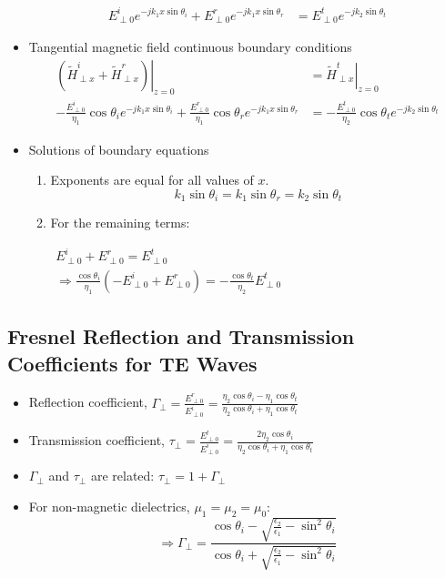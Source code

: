 \documentclass[a4paper]{article}
\begin{document}
\begin{itemize}
\begin{align*}
        E^i_{\perp 0}e^{-jk_1 x\sin\theta_i} + E^r_{\perp 0}e^{-jk_1 x\sin\theta_r} &= E^t_{\perp 0}e^{-jk_2\sin\theta_t}
    \end{align*}
    \item Tangential magnetic field continuous boundary conditions
    \begin{align*}
        \left.(\widetilde{H}^i_{\perp x}+\widetilde{H}^r_{\perp x})\right|_{z=0} &= \left.\widetilde{H}^t_{\perp x}\right|_{z=0}\\
        -\frac{E^i_{\perp 0}}{\eta_1}\cos\theta_i e^{-jk_1 x\sin\theta_i} + \frac{E^r_{\perp 0}}{\eta_1}\cos\theta_r e^{-jk_1 x\sin\theta_r} &= -\frac{E^t_{\perp 0}}{\eta_2}\cos\theta_t e^{-jk_2\sin\theta_t}
    \end{align*}
    \item Solutions of boundary equations
    \begin{enumerate}
        \item Exponents are equal for all values of $x$.
        $$k_1\sin\theta_i = k_1\sin\theta_r = k_2\sin\theta_t$$
        \item For the remaining terms:
        \begin{center}
            $\begin{array}{c}
                 E^i_{\perp 0} + E^r_{\perp 0} = E^t_{\perp 0}\\
                 \Rightarrow \displaystyle\frac{\cos\theta_i}{\eta_1}(-E^i_{\perp 0}+E^r_{\perp 0}) = -\displaystyle\frac{\cos\theta_t}{\eta_2}E^t_{\perp 0} 
            \end{array}$
        \end{center}
    \end{enumerate}
\end{itemize}

\subsection{Fresnel Reflection and Transmission Coefficients for TE Waves}
\begin{itemize}
    \item Reflection coefficient, $\Gamma_\perp = \displaystyle\frac{E^r_{\perp 0}}{E^i_{\perp 0}} = \displaystyle\frac{\eta_2\cos\theta_i-\eta_1\cos\theta_t}{\eta_2\cos\theta_i+\eta_1\cos\theta_t}$
    \item Transmission coefficient, $\tau_\perp = \displaystyle\frac{E^t_{\perp 0}}{E^i_{\perp 0}} = \displaystyle\frac{2\eta_2\cos\theta_i}{\eta_2\cos\theta_i+\eta_1\cos\theta_t}$
    \item $\Gamma_\perp$ and $\tau_\perp$ are related: $\tau_\perp = 1+\Gamma_\perp$
    \item For non-magnetic dielectrics, $\mu_1 = \mu_2 = \mu_0$:
    $$\Rightarrow \Gamma_\perp = \frac{\cos\theta_i-\sqrt{\displaystyle\frac{\epsilon_2}{\epsilon_1}-\sin^2\theta_i}}{\cos\theta_i+\sqrt{\displaystyle\frac{\epsilon_2}{\epsilon_1}-\sin^2\theta_i}}$$
\end{itemize}
\end{document}
